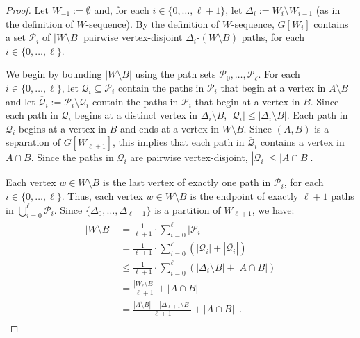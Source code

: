 \documentclass{patmorin}
\newcommand{\hussein}[1]{\textcolor{purple}{HH: #1}}
\begin{document}
\begin{proof}
  Let $W_{-1}:=\emptyset$ and, for each $i\in\{0,\ldots,\ell+1\}$, let $\Delta_{i}:=W_{i}\setminus W_{i-1}$ (as in the definition of $W$-sequence).
  By the definition of $W$-sequence, $G[W_{i}]$ contains a set $\mathcal{P}_i$ of $|W\setminus B|$ pairwise vertex-disjoint $\Delta_i$-$(W\setminus B)$ paths, for each $i\in\{0,\ldots,\ell\}$.

  We begin by bounding $|W\setminus B|$ using the path sets $\mathcal{P}_0,\ldots,\mathcal{P}_{\ell}$.  For each $i\in\{0,\ldots,\ell\}$, let $\mathcal{Q}_i\subseteq \mathcal{P}_i$ contain the paths in $\mathcal{P}_i$ that begin at a vertex in $A\setminus B$ and let $\overline{\mathcal{Q}}_i:=\mathcal{P}_i\setminus \mathcal{Q}_i$ contain the paths in $\mathcal{P}_i$ that begin at a vertex in $B$.  Since each path in $\mathcal{Q}_i$ begins at a distinct vertex in $\Delta_i\setminus B$, $|\mathcal{Q}_i|\le|\Delta_i\setminus B|$. Each path in $\overline{\mathcal{Q}}_i$ begins at a vertex in $B$ and ends at a vertex in $W\setminus B$. Since $(A,B)$ is a separation of $G[W_{\ell+1}]$, this implies that each path in $\overline{\mathcal{Q}}_i$ contains a vertex in $A\cap B$.  Since the paths in $\overline{\mathcal{Q}}_i$ are pairwise vertex-disjoint, $|\overline{\mathcal{Q}}_i|\le |A\cap B|$.

  Each vertex $w\in W\setminus B$ is the last vertex of exactly one path in $\mathcal{P}_i$, for each $i\in\{0,\ldots,\ell\}$. Thus, each vertex $w\in W\setminus B$ is the endpoint of exactly $\ell+1$ paths in $\bigcup_{i=0}^\ell\mathcal{P}_i$.  Since $\{\Delta_0,\ldots,\Delta_{\ell+1}\}$ is a partition of $W_{\ell+1}$, we have:
  \begin{align}
  \begin{split}
    |W\setminus B|
      & = \frac{1}{\ell+1}\cdot\sum_{i=0}^{\ell}|\mathcal{P}_i| \\
      & = \frac{1}{\ell+1}\cdot\sum_{i=0}^{\ell}\left(|\mathcal{Q}_i|+|\overline{\mathcal{Q}_i}|\right) \\
      & \le \frac{1}{\ell+1}\cdot\sum_{i=0}^{\ell}\left(|\Delta_i\setminus B|+|A\cap B|\right) \\
      & = \frac{|W_\ell\setminus B|}{\ell+1} + |A\cap B| \\
      & = \frac{|A\setminus B|-|\Delta_{\ell+1}\setminus B|}{\ell+1} + |A\cap B| \enspace .  \label{w_b_bound}
  \end{split}
  \end{align}


\end{proof}
\end{document}
